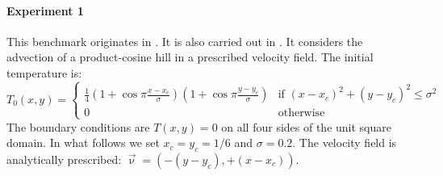 
\paragraph{Experiment 1}

This benchmark originates in \cite{dohu03}. It is also carried out in \cite{bepo10}.
It considers the advection of a product-cosine hill
in a prescribed velocity field. The initial temperature is:
\begin{equation}
T_0(x,y)=
\left\{
\begin{array}{cc}
\frac{1}{4}
\left(1+\cos \pi\frac{x-x_c}{\sigma}\right)
\left(1+\cos \pi\frac{y-y_c}{\sigma}\right)
& \text{if } (x-x_c)^2+(y-y_c)^2\leq \sigma^2 \\
0 & \text{otherwise}
\end{array}
\right.
\end{equation}
The boundary conditions are $T(x,y)=0$ on all four sides of the unit square domain. In what follows we set $x_c=y_c=1/6$ and $\sigma=0.2$.  The velocity field is analytically prescribed: $\vec\upnu=(-(y-y_c),+(x-x_c))$.

